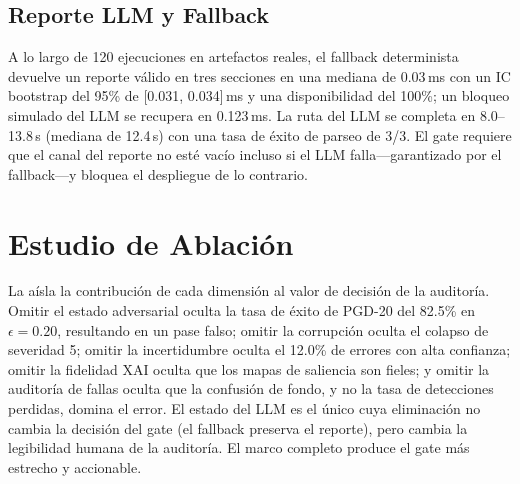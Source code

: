 \documentclass[10pt,twocolumn,letterpaper]{article}
\begin{document}
\subsection{Reporte LLM y Fallback}
A lo largo de 120 ejecuciones en artefactos reales, el fallback determinista devuelve un reporte válido en tres secciones en una mediana de 0.03\,ms con un IC bootstrap del 95\% de [0.031, 0.034]\,ms y una disponibilidad del 100\%; un bloqueo simulado del LLM se recupera en 0.123\,ms. La ruta del LLM se completa en 8.0--13.8\,s (mediana de 12.4\,s) con una tasa de éxito de parseo de 3/3. El gate requiere que el canal del reporte no esté vacío incluso si el LLM falla---garantizado por el fallback---y bloquea el despliegue de lo contrario.

\section{Estudio de Ablación}
\label{sec:ablation}
La  aísla la contribución de cada dimensión al valor de decisión de la auditoría. Omitir el estado adversarial oculta la tasa de éxito de PGD-20 del 82.5\% en $\epsilon=0.20$, resultando en un pase falso; omitir la corrupción oculta el colapso de severidad 5; omitir la incertidumbre oculta el 12.0\% de errores con alta confianza; omitir la fidelidad XAI oculta que los mapas de saliencia son fieles; y omitir la auditoría de fallas oculta que la confusión de fondo, y no la tasa de detecciones perdidas, domina el error. El estado del LLM es el único cuya eliminación no cambia la decisión del gate (el fallback preserva el reporte), pero cambia la legibilidad humana de la auditoría. El marco completo produce el gate más estrecho y accionable.
\end{document}

